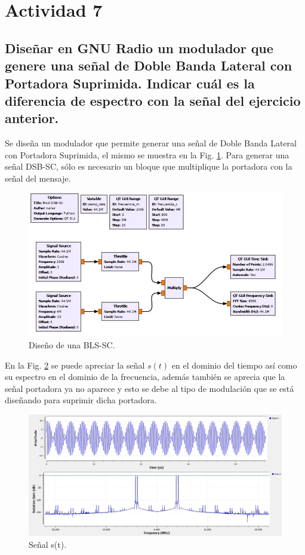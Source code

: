 \section{Actividad 7}

\subsection*{Diseñar en GNU Radio un modulador que genere una señal de Doble Banda Lateral con Portadora Suprimida. Indicar cuál es la diferencia de espectro con la señal del ejercicio anterior.}

Se diseña un modulador que permite generar una señal de Doble Banda Lateral con
Portadora Suprimida, el mismo se muestra en la Fig. \ref{fig:diseño_7}. Para generar una señal DSB-SC, sólo es necesario un bloque que multiplique la portadora con la señal del mensaje.

    \begin{figure}[H]
        \centering
        \includegraphics[width=0.7\linewidth]{imagenes/Parte_1/Actividad_7/ejercicio_7.jpg}
        \caption{Diseño de una BLS-SC.}
        \label{fig:diseño_7}
    \end{figure}

En la Fig. \ref{fig:espectro_7} se puede apreciar la señal $s (t)$ en el dominio del tiempo así como su espectro en el dominio de la frecuencia, además también se aprecia que la señal portadora ya no aparece y esto se debe al tipo de modulación que se está diseñando para suprimir dicha portadora.

    \begin{figure}[H]
        \centering
        \includegraphics[width=0.9\linewidth]{imagenes/Parte_1/Actividad_7/ejercicio_7_espectro.jpg}
        \caption{Señal s(t).}
        \label{fig:espectro_7}
    \end{figure}
    